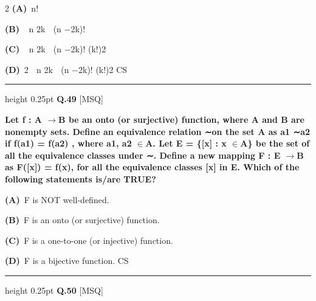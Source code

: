 \documentclass[a4paper,10pt,twoside]{article}
\begin{document}
\begin{multicols}{2}
\textbf{(A)}~n!\par\vspace{2pt}\noindent
\textbf{(B)}~ n \newline 2k \newline  \newline (n −2k)!\par\vspace{2pt}\noindent
\textbf{(C)}~ n \newline 2k \newline  \newline (n −2k)! (k!)2\par\vspace{2pt}\noindent
\textbf{(D)}~2 \newline  n \newline 2k \newline  \newline (n −2k)! (k!)2 \newline CS
\par\vspace{6pt}\hrule height 0.25pt\vspace{6pt}
\noindent\textbf{Q.49} \hfill {\footnotesize\textsf{[MSQ]}}
\par\vspace{2pt}
{\bfseries Let f : A $\to$B be an onto (or surjective) function, where A and B are nonempty
sets. Deﬁne an equivalence relation ∼on the set A as
a1 ∼a2 if f(a1) = f(a2) ,
where a1, a2 $\in$A. Let E = \{[x] : x $\in$A\} be the set of all the equivalence classes
under ∼. Deﬁne a new mapping F : E $\to$B as
F([x]) = f(x),
for all the equivalence classes [x] in E.
Which of the following statements is/are TRUE? \par}
\par\vspace{2pt}\noindent
\textbf{(A)}~F is NOT well-deﬁned.\par\vspace{2pt}\noindent
\textbf{(B)}~F is an onto (or surjective) function.\par\vspace{2pt}\noindent
\textbf{(C)}~F is a one-to-one (or injective) function.\par\vspace{2pt}\noindent
\textbf{(D)}~F is a bijective function. \newline CS
\par\vspace{6pt}\hrule height 0.25pt\vspace{6pt}
\noindent\textbf{Q.50} \hfill {\footnotesize\textsf{[MSQ]}}

\end{multicols}
\end{document}
